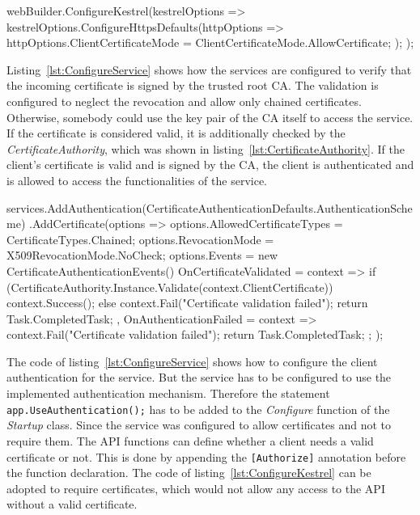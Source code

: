 \noindent \begin{minipage}{\linewidth}
\begin{CsCode}[label={lst:ConfigureKestrel}, caption={Configure Kestrel to allow certificates~\cite{implkritnermtls}},captionpos=b]
webBuilder.ConfigureKestrel(kestrelOptions => {
    kestrelOptions.ConfigureHttpsDefaults(httpOptions => {
        httpOptions.ClientCertificateMode = ClientCertificateMode.AllowCertificate;
    });
});
\end{CsCode}
\end{minipage}

Listing~\ref{lst:ConfigureService} shows how the services are configured to verify that the incoming certificate is signed by the trusted root CA.
The validation is configured to neglect the revocation and allow only chained certificates. Otherwise, somebody could use the key pair of the CA itself to access the service.
If the certificate is considered valid, it is additionally checked by the \textit{CertificateAuthority}, which was shown in listing~\ref{lst:CertificateAuthority}.
If the client's certificate is valid and is signed by the CA, the client is authenticated and is allowed to access the functionalities of the service.

\noindent \begin{minipage}{\linewidth}
\begin{CsCode}[label={lst:ConfigureService}, caption={Configure the certificate authentication for the service~\cite{implkritnermtls}},captionpos=b]
services.AddAuthentication(CertificateAuthenticationDefaults.AuthenticationScheme)
.AddCertificate(options => {
    options.AllowedCertificateTypes = CertificateTypes.Chained;
    options.RevocationMode = X509RevocationMode.NoCheck;
    options.Events = new CertificateAuthenticationEvents() {
        OnCertificateValidated = context => {
            if (CertificateAuthority.Instance.Validate(context.ClientCertificate)) {
                context.Success();
            } else {
                context.Fail("Certificate validation failed");
            }
            return Task.CompletedTask;
        },
        OnAuthenticationFailed = context => {
            context.Fail("Certificate validation failed");
            return Task.CompletedTask;
        }
    };
});
\end{CsCode}
\end{minipage}

The code of listing~\ref{lst:ConfigureService} shows how to configure the client authentication for the service.
But the service has to be configured to use the implemented authentication mechanism.
Therefore the statement \lstinline{app.UseAuthentication();} has to be added to the \textit{Configure} function of the \textit{Startup} class. 
Since the service was configured to allow certificates and not to require them. 
The API functions can define whether a client needs a valid certificate or not.
This is done by appending the \lstinline{[Authorize]} annotation before the function declaration.
The code of listing~\ref{lst:ConfigureKestrel} can be adopted to require certificates, which would not allow any access to the API without a valid certificate.

